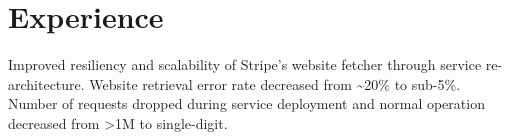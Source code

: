 \documentclass[]{deedy-resume-openfont}
\begin{document}
\begin{minipage}[t]{0.64\textwidth} 

\gap
\section{Experience}

\minigap
{}
\minigap
\vspace{\topsep} %
\begin{tightemize}
\item Improved resiliency and scalability of Stripe's website fetcher through service re-architecture. Website retrieval error rate decreased from \textasciitilde20\% to sub-5\%. Number of requests dropped during service deployment and normal operation decreased from >1M to single-digit.
\end{tightemize}
\sectionsep


\end{minipage}
\end{document}
